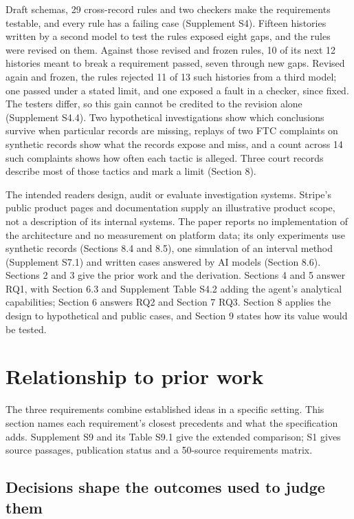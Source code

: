 \documentclass[acmlarge,nonacm]{acmart}
\begin{document}
Draft schemas, 29 cross-record rules and two checkers make the
requirements testable, and every rule has a failing case (Supplement
S4). Fifteen histories written by a second model to test the rules
exposed eight gaps, and the rules were revised on them. Against those
revised and frozen rules, 10 of its next 12 histories meant to break a
requirement passed, seven through new gaps. Revised again and frozen,
the rules rejected 11 of 13 such histories from a third model; one
passed under a stated limit, and one exposed a fault in a checker, since
fixed. The testers differ, so this gain cannot be credited to the
revision alone (Supplement S4.4). Two hypothetical investigations show
which conclusions survive when particular records are missing, replays
of two FTC complaints on synthetic records show what the records expose
and miss, and a count across 14 such complaints shows how often each
tactic is alleged. Three court records describe most of those tactics
and mark a limit (Section 8).

The intended readers design, audit or evaluate investigation systems.
Stripe's public product pages and documentation supply an illustrative
product scope, not a description of its internal systems. The paper
reports no implementation of the architecture and no measurement on
platform data; its only experiments use synthetic records (Sections 8.4
and 8.5), one simulation of an interval method (Supplement S7.1) and
written cases answered by AI models (Section 8.6). Sections 2 and 3 give
the prior work and the derivation. Sections 4 and 5 answer RQ1, with
Section 6.3 and Supplement Table S4.2 adding the agent's analytical
capabilities; Section 6 answers RQ2 and Section 7 RQ3. Section 8 applies
the design to hypothetical and public cases, and Section 9 states how
its value would be tested.

\hypertarget{relationship-to-prior-work}{%
\section{Relationship to prior work}\label{relationship-to-prior-work}}

The three requirements combine established ideas in a specific setting.
This section names each requirement's closest precedents and what the
specification adds. Supplement S9 and its Table S9.1 give the extended
comparison; S1 gives source passages, publication status and a 50-source
requirements matrix.

\hypertarget{decisions-shape-the-outcomes-used-to-judge-them}{%
\subsection{Decisions shape the outcomes used to judge
them}\label{decisions-shape-the-outcomes-used-to-judge-them}}
\end{document}
